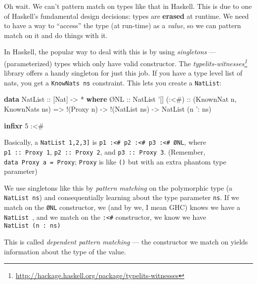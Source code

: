 \documentclass[]{article}
\newenvironment{Shaded}{}{}
\newcommand{\KeywordTok}[1]{\textcolor[rgb]{0.00,0.44,0.13}{\textbf{{#1}}}}
\newcommand{\DataTypeTok}[1]{\textcolor[rgb]{0.56,0.13,0.00}{{#1}}}
\newcommand{\DecValTok}[1]{\textcolor[rgb]{0.25,0.63,0.44}{{#1}}}
\newcommand{\CharTok}[1]{\textcolor[rgb]{0.25,0.44,0.63}{{#1}}}
\newcommand{\OtherTok}[1]{\textcolor[rgb]{0.00,0.44,0.13}{{#1}}}
\newcommand{\FunctionTok}[1]{\textcolor[rgb]{0.02,0.16,0.49}{{#1}}}
\newcommand{\NormalTok}[1]{{#1}}
\renewcommand{\href}[2]{#2\footnote{\url{#1}}}
\begin{document}
Oh wait. We can't pattern match on types like that in Haskell. This is
due to one of Haskell's fundamental design decisions: types are
\textbf{erased} at runtime. We need to have a way to ``access'' the type
(at run-time) as a \emph{value}, so we can pattern match on it and do
things with it.

In Haskell, the popular way to deal with this is by using
\emph{singletons} --- (parameterized) types which only have valid
constructor. The
\emph{\href{http://hackage.haskell.org/package/typelits-witnesses}{typelits-witnesses}}
library offers a handy singleton for just this job. If you have a type
level list of nats, you get a \texttt{KnowNats\ ns} constraint. This
lets you create a \texttt{NatList}:

\begin{Shaded}
\begin{Highlighting}[]
\KeywordTok{data} \DataTypeTok{NatList}\OtherTok{ ::} \NormalTok{[}\DataTypeTok{Nat}\NormalTok{] }\OtherTok{->} \FunctionTok{*} \KeywordTok{where}
    \NormalTok{Ø}\DataTypeTok{NL}\OtherTok{   ::} \DataTypeTok{NatList} \CharTok{'[]}
\OtherTok{    (:<#) ::} \NormalTok{(}\DataTypeTok{KnownNat} \NormalTok{n, }\DataTypeTok{KnownNats} \NormalTok{ns)}
          \OtherTok{=>} \FunctionTok{!}\NormalTok{(}\DataTypeTok{Proxy} \NormalTok{n) }\OtherTok{->} \FunctionTok{!}\NormalTok{(}\DataTypeTok{NatList} \NormalTok{ns) }\OtherTok{->} \DataTypeTok{NatList} \NormalTok{(n }\CharTok{': ns)}

\KeywordTok{infixr} \DecValTok{5} \FunctionTok{:<#}
\end{Highlighting}
\end{Shaded}

Basically, a \texttt{NatList\ \textquotesingle{}{[}1,2,3{]}} is
\texttt{p1\ :\textless{}\#\ p2\ :\textless{}\#\ p3\ :\textless{}\#\ ØNL},
where \texttt{p1\ ::\ Proxy\ 1}, \texttt{p2\ ::\ Proxy\ 2}, and
\texttt{p3\ ::\ Proxy\ 3}. (Remember, \texttt{data\ Proxy\ a\ =\ Proxy};
\texttt{Proxy} is like \texttt{()} but with an extra phantom type
parameter)

We use singletons like this by \emph{pattern matching} on the
polymorphic type (a \texttt{NatList\ ns}) and consequentially learning
about the type parameter \texttt{ns}. If we match on the \texttt{ØNL}
constructor, we (and by we, I mean GHC) knows we have a
\texttt{NatList\ \textquotesingle{}{[}{]}}, and we match on the
\texttt{:\textless{}\#} constructor, we know we have
\texttt{NatList\ (n\ \textquotesingle{}:\ ns)}

This is called \emph{dependent pattern matching} --- the constructor we
match on yields information about the type of the value.
\end{document}
